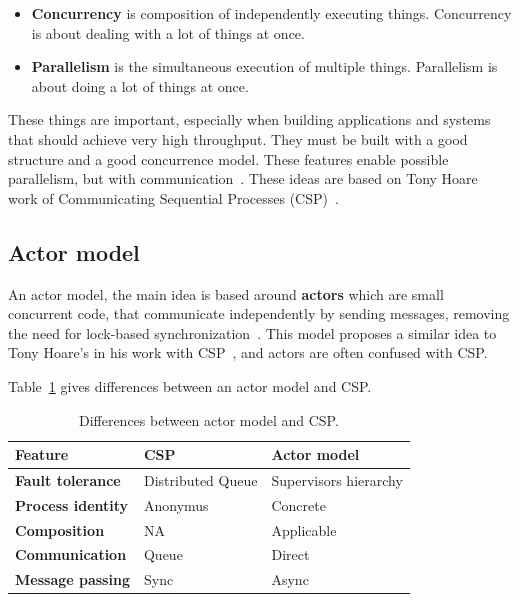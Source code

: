 \begin{itemize}
	\item \textbf{Concurrency} is composition of independently executing things. Concurrency is about dealing with a lot of things at once.
	\item \textbf{Parallelism} is the simultaneous execution of multiple things. Parallelism is about doing a lot of things at once. 
\end{itemize}

\noindent
These things are important, especially when building applications and systems that should achieve very high throughput. They must be built with a good structure and a good concurrence model. These features enable possible parallelism, but with communication~\cite{Pike}. These ideas are based on Tony Hoare work of Communicating Sequential Processes (CSP)~\cite{Hoare78}.

\subsection{Actor model}\label{sec:actor_model}
%
An actor model, the main idea is based around \textbf{actors} which are small concurrent code, that communicate independently by sending messages, removing the need for lock-based synchronization~\cite{Hewitt}. This model proposes a similar idea to Tony Hoare's in his work with CSP~\cite{Hoare78}, and actors are often confused with CSP. 

Table~\ref{tab:table6} gives differences between an actor model and CSP.

\begin{table}[h!]
	\begin{center}
		\begin{tabular}{l|l|l}
			\textbf{Feature} & \textbf{CSP} & \textbf{Actor model}\\
			\hline
			\textbf{Fault tolerance} & Distributed Queue &  Supervisors hierarchy \\
			\textbf{Process identity} & Anonymus & Concrete \\
			\textbf{Composition} & NA & Applicable \\
			\textbf{Communication} & Queue & Direct \\
			\textbf{Message passing} & Sync & Async\\
		\end{tabular}
	\end{center}
	\vspace{-0.5cm}
	\caption{Differences between actor model and CSP.}
	\label{tab:table6}
\end{table}

